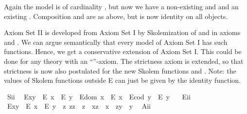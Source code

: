 \begin{isabellebody}
%
\begin{isamarkuptext}%
Again the model is of cardinality , but now we have a non-existing  and 
  and an existing . Composition \isa{{\isasymcdot}} and  are as above, but 
   is now identity on all objects.%
\end{isamarkuptext}\isamarkuptrue%
%
\isamarkuptrue%
%
\begin{isamarkuptext}%
Axiom Set II is developed from Axiom Set I by Skolemization of  and  
 in axioms  and . We can argue semantically that every model of Axiom Set I has such 
 functions. Hence, we get a conservative extension of Axiom Set I. This could be done for any 
 theory with an ``''-axiom. The strictness axiom  is extended, 
 so that strictness is now also postulated for the new Skolem functions  
 and . Note: the values of Skolem functions outside E can just be given by 
the identity function.%
\end{isamarkuptext}\isamarkuptrue%
\ S\isactrlsub i\isactrlsub i{\isacharcolon}\ %
\ {\isachardoublequoteopen}{\isacharparenleft}E{\isacharparenleft}x{\isasymcdot}y{\isacharparenright}\ \isactrlbold {\isasymrightarrow}\ {\isacharparenleft}E\ x\ \isactrlbold {\isasymand}\ E\ y{\isacharparenright}{\isacharparenright}\ \isactrlbold {\isasymand}\ {\isacharparenleft}E{\isacharparenleft}dom\ x{\isacharparenright}\ \isactrlbold {\isasymrightarrow}\ E\ x{\isacharparenright}\ \isactrlbold {\isasymand}\ {\isacharparenleft}E{\isacharparenleft}cod\ y{\isacharparenright}\ \isactrlbold {\isasymrightarrow}\ E\ y{\isacharparenright}{\isachardoublequoteclose}\ \ \isanewline
\ E\isactrlsub i\isactrlsub i{\isacharcolon}\ %
\ {\isachardoublequoteopen}E{\isacharparenleft}x{\isasymcdot}y{\isacharparenright}\ \isactrlbold {\isasymleftarrow}\ {\isacharparenleft}E\ x\ \isactrlbold {\isasymand}\ E\ y\ \isactrlbold {\isasymand}\ {\isacharparenleft}\isactrlbold {\isasymexists}z{\isachardot}\ z{\isasymcdot}z\ {\isasymcong}\ z\ \isactrlbold {\isasymand}\ x{\isasymcdot}z\ {\isasymcong}\ x\ \isactrlbold {\isasymand}\ z{\isasymcdot}y\ {\isasymcong}\ y{\isacharparenright}{\isacharparenright}{\isachardoublequoteclose}\ \isanewline
\ A\isactrlsub i\isactrlsub i{\isacharcolon}\ %

\end{isabellebody}
